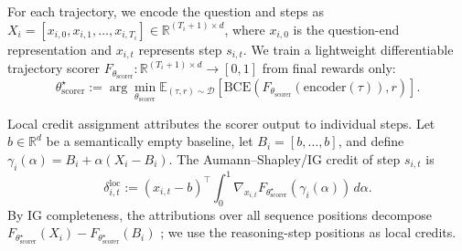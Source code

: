 For each trajectory, we encode the question and steps as
\(
X_i=[x_{i,0},x_{i,1},\ldots,x_{i,T_i}]
\in\mathbb{R}^{(T_i+1)\times d}
\),
where \(x_{i,0}\) is the question-end representation and \(x_{i,t}\) represents
step \(s_{i,t}\).
We train a lightweight differentiable trajectory scorer
\(F_{\theta_{\mathrm{scorer}}}:\mathbb{R}^{(T_i+1)\times d}\rightarrow[0,1]\)
from final rewards only:
\begin{equation}
\label{eq:stage1_objective}
\theta_{\mathrm{scorer}}^\star
:=
\arg\min_{\theta_{\mathrm{scorer}}}
\mathbb{E}_{(\tau,r)\sim\mathcal{D}}
\left[
\mathrm{BCE}\!\left(F_{\theta_{\mathrm{scorer}}}(\mathrm{encoder}(\tau)),r\right)
\right].
\end{equation}

Local credit assignment attributes the scorer output to individual steps.
Let \(b\in\mathbb{R}^{d}\) be a semantically empty baseline, let
\(B_i=[b,\ldots,b]\), and define
\(\gamma_i(\alpha)=B_i+\alpha(X_i-B_i)\).
The Aumann--Shapley/IG credit of step \(s_{i,t}\) is
\begin{equation}
\label{eq:delta_local}
\delta_{i,t}^{\mathrm{loc}}
:=
\left(x_{i,t}-b\right)^\top
\int_0^1
\nabla_{x_{i,t}}
F_{\theta_{\mathrm{scorer}}^\star}\!\left(\gamma_i(\alpha)\right)
\,d\alpha .
\end{equation}
By IG completeness, the attributions over all sequence positions decompose
\(F_{\theta_{\mathrm{scorer}}^\star}(X_i)
-F_{\theta_{\mathrm{scorer}}^\star}(B_i)\)
\citep{sundararajan2017axiomatic,pmlr-v119-sundararajan20b};
we use the reasoning-step positions as local credits.

